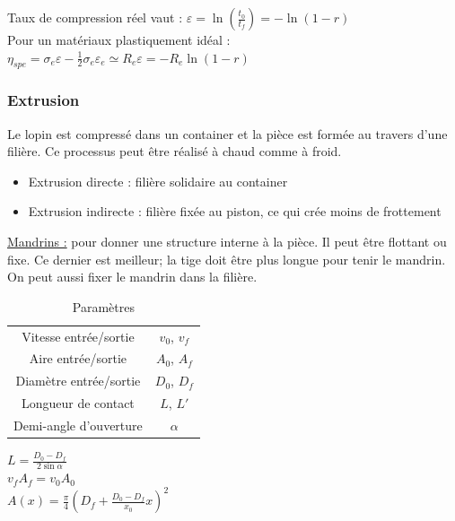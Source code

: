 \documentclass[../main.tex]{subfiles}
\begin{document}
Taux de compression réel vaut : $\varepsilon = \ln(\frac{t_0}{t_f}) = -\ln(1-r)$\\

Pour un matériaux plastiquement idéal : $\eta_{spe} = \sigma_e \varepsilon - \frac{1}{2} \sigma_e \varepsilon_e \simeq R_e \varepsilon = -R_e \ln(1-r)$\\


\subsubsection{Extrusion}
Le lopin est compressé dans un container et la pièce est formée au travers d'une filière. Ce processus peut être réalisé à chaud comme à froid. \\

\begin{itemize}
    \item Extrusion directe : filière solidaire au container\\
    \item Extrusion indirecte : filière fixée au piston, ce qui crée moins de frottement\\
\end{itemize}

\quad \underline{Mandrins :} pour donner une structure interne à la pièce. Il peut être flottant ou fixe. Ce dernier est meilleur; la tige doit être plus longue pour tenir le mandrin. On peut aussi fixer le mandrin dans la filière.\\

\begin{table}[hbt!]
    \centering
    \begin{tabular}{c|c}
    \hline \hline
        Vitesse entrée/sortie & $v_0$, $v_f$ \\
        Aire entrée/sortie & $A_0$, $A_f$\\
        Diamètre entrée/sortie & $D_0$, $D_f$\\
        Longueur de contact & $L$, $L'$\\
        Demi-angle d'ouverture & $\alpha$\\
        \hline
    \end{tabular}
    \caption{Paramètres}
\end{table}
$L = \frac{D_0-D_f}{2 \sin{\alpha}}$\\
$v_f A_f = v_0 A_0$\\
$A(x) = \frac{\pi}{4}(D_f + \frac{D_0-D_f}{x_0}x)^2$\\
\end{document}
